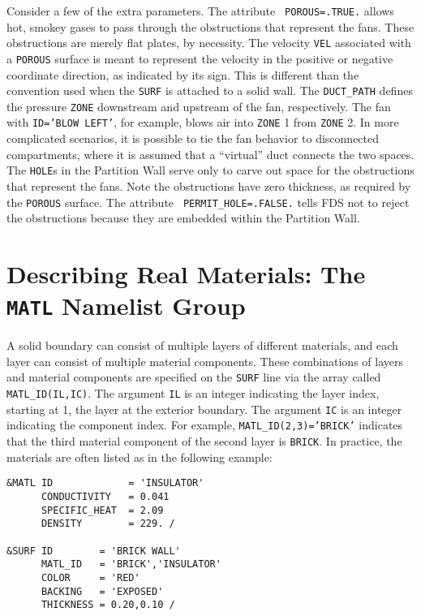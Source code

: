 \documentclass[11pt]{book}
\newcommand{\ct}{\tt\small}
\begin{document}
\noindent
Consider a few of the extra parameters. The attribute {\ct
POROUS=.TRUE.} allows hot, smokey gases to pass through the
obstructions that represent the fans. These obstructions are merely
flat plates, by necessity. The velocity {\ct VEL} associated with a
{\ct POROUS} surface is meant to represent the velocity in the
positive or negative coordinate direction, as indicated by its
sign. This is different than the convention used when the {\ct SURF}
is attached to a solid wall. The {\ct DUCT\_PATH} defines the pressure
{\ct ZONE} downstream and upstream of the fan, respectively. The fan
with {\ct ID='BLOW LEFT'}, for example, blows air into {\ct ZONE} 1
from {\ct ZONE} 2.  In more complicated scenarios, it is possible to
tie the fan behavior to disconnected compartments, where it is assumed
that a ``virtual'' duct connects the two spaces. The {\ct HOLE}s in
the Partition Wall serve only to carve out space for the obstructions
that represent the fans. Note the obstructions have zero thickness, as
required by the {\ct POROUS} surface. The attribute {\ct
PERMIT\_HOLE=.FALSE.} tells FDS not to reject the obstructions because
they are embedded within the Partition Wall.










\clearpage


\section{Describing Real Materials: The \texorpdfstring{{\tt MATL}}{MATL} Namelist Group}
\label{info:MATL}

A solid boundary can consist of multiple layers of different
materials, and each layer can consist of multiple material
components. These combinations of layers and material components are
specified on the {\ct SURF} line via the array called {\ct
MATL\_ID(IL,IC)}. The argument {\ct IL} is an integer indicating the
layer index, starting at 1, the layer at the exterior boundary. The
argument {\ct IC} is an integer indicating the component index. For
example, {\ct MATL\_ID(2,3)='BRICK'} indicates that the third material
component of the second layer is {\ct BRICK}. In practice, the
materials are often listed as in the following example:

\footnotesize
\begin{verbatim}
&MATL ID             = 'INSULATOR'
      CONDUCTIVITY   = 0.041
      SPECIFIC_HEAT  = 2.09
      DENSITY        = 229. /

&SURF ID        = 'BRICK WALL'
      MATL_ID   = 'BRICK','INSULATOR'
      COLOR     = 'RED'
      BACKING   = 'EXPOSED'
      THICKNESS = 0.20,0.10 /

\end{verbatim}
\normalsize
\end{document}
